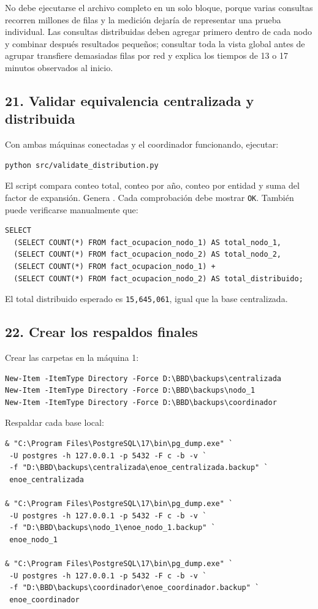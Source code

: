 \documentclass[12pt,letterpaper]{article}
\newcommand{\ruta}[1]{\texttt{\detokenize{#1}}}
\begin{document}
No debe ejecutarse el archivo completo en un solo bloque, porque varias
consultas recorren millones de filas y la medición dejaría de representar una
prueba individual. Las consultas distribuidas deben agregar primero dentro de
cada nodo y combinar después resultados pequeños; consultar toda la vista
global antes de agrupar transfiere demasiadas filas por red y explica los
tiempos de 13 o 17 minutos observados al inicio.

\subsection{21. Validar equivalencia centralizada y distribuida}

Con ambas máquinas conectadas y el coordinador funcionando, ejecutar:

\begin{lstlisting}
python src/validate_distribution.py
\end{lstlisting}

El script compara conteo total, conteo por año, conteo por entidad y suma del
factor de expansión. Genera
\ruta{docs/resultados_validacion.md}. Cada comprobación debe mostrar
\texttt{OK}. También puede verificarse manualmente que:

\begin{lstlisting}
SELECT
  (SELECT COUNT(*) FROM fact_ocupacion_nodo_1) AS total_nodo_1,
  (SELECT COUNT(*) FROM fact_ocupacion_nodo_2) AS total_nodo_2,
  (SELECT COUNT(*) FROM fact_ocupacion_nodo_1) +
  (SELECT COUNT(*) FROM fact_ocupacion_nodo_2) AS total_distribuido;
\end{lstlisting}

El total distribuido esperado es \texttt{15,645,061}, igual que la base
centralizada.

\subsection{22. Crear los respaldos finales}

Crear las carpetas en la máquina 1:

\begin{lstlisting}
New-Item -ItemType Directory -Force D:\BBD\backups\centralizada
New-Item -ItemType Directory -Force D:\BBD\backups\nodo_1
New-Item -ItemType Directory -Force D:\BBD\backups\coordinador
\end{lstlisting}

Respaldar cada base local:

\begin{lstlisting}
& "C:\Program Files\PostgreSQL\17\bin\pg_dump.exe" `
 -U postgres -h 127.0.0.1 -p 5432 -F c -b -v `
 -f "D:\BBD\backups\centralizada\enoe_centralizada.backup" `
 enoe_centralizada

& "C:\Program Files\PostgreSQL\17\bin\pg_dump.exe" `
 -U postgres -h 127.0.0.1 -p 5432 -F c -b -v `
 -f "D:\BBD\backups\nodo_1\enoe_nodo_1.backup" `
 enoe_nodo_1

& "C:\Program Files\PostgreSQL\17\bin\pg_dump.exe" `
 -U postgres -h 127.0.0.1 -p 5432 -F c -b -v `
 -f "D:\BBD\backups\coordinador\enoe_coordinador.backup" `
 enoe_coordinador
\end{lstlisting}
\end{document}
